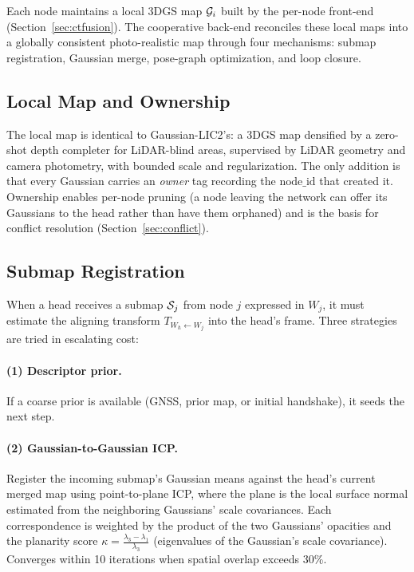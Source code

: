 \label{sec:mapping}

Each node maintains a local 3DGS map $\mathcal{G}_i$ built by the per-node
front-end (Section~\ref{sec:ctfusion}). The cooperative back-end reconciles
these local maps into a globally consistent photo-realistic map through four
mechanisms: submap registration, Gaussian merge, pose-graph optimization, and
loop closure.

\subsection{Local Map and Ownership}
\label{sec:local}

The local map is identical to Gaussian-LIC2's: a 3DGS map densified by a
zero-shot depth completer for LiDAR-blind areas, supervised by LiDAR geometry
and camera photometry, with bounded scale and regularization. The only
addition is that every Gaussian carries an \emph{owner} tag recording the
$\text{node\_id}$ that created it. Ownership enables per-node pruning (a node
leaving the network can offer its Gaussians to the head rather than have them
orphaned) and is the basis for conflict resolution
(Section~\ref{sec:conflict}).

\subsection{Submap Registration}
\label{sec:registration}

When a head receives a submap $\mathcal{S}_j$ from node $j$ expressed in $W_j$, it
must estimate the aligning transform $T_{W_h \leftarrow W_j}$ into the head's
frame. Three strategies are tried in escalating cost:

\paragraph{(1) Descriptor prior.} If a coarse prior is available (GNSS, prior
map, or initial handshake), it seeds the next step.

\paragraph{(2) Gaussian-to-Gaussian ICP.} Register the incoming submap's
Gaussian means against the head's current merged map using point-to-plane ICP,
where the plane is the local surface normal estimated from the neighboring
Gaussians' scale covariances. Each correspondence is weighted by the product of
the two Gaussians' opacities and the planarity score
$\kappa = \frac{\lambda_3 - \lambda_1}{\lambda_3}$ (eigenvalues of the
Gaussian's scale covariance). Converges within 10 iterations when spatial
overlap exceeds 30\%.

